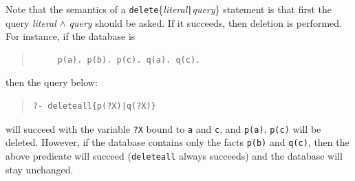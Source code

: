 \documentclass[11pt]{article}
\begin{document}
Note that the semantics of a {\tt delete}\{\emph{literal}{\tt |}{\it query}\}
statement is that first the query \emph{literal} $\wedge$ \emph{query} should
be asked. If it succeeds, then deletion is performed. For instance, if the
database is
\begin{quote}
\begin{verbatim}
     p(a). p(b). p(c). q(a). q(c).
\end{verbatim}
\end{quote}
then the query below:
\begin{quote}
\begin{verbatim}
?- deleteall{p(?X)|q(?X)}
\end{verbatim}
\end{quote}
will succeed with the variable {\tt ?X} bound to {\tt a} and {\tt c}, and
{\tt p(a)}, {\tt p(c)} will be deleted.  However, if the database contains
only the facts {\tt p(b)} and {\tt q(c)}, then the above predicate will
succeed ({\tt deleteall} always succeeds) and the database will stay
unchanged.
\end{document}

